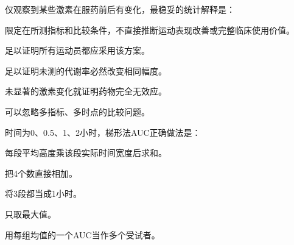 \par\addvspace{6pt}\noindent\begin{minipage}{\linewidth}


仅观察到某些激素在服药前后有变化，最稳妥的统计解释是：


\begin{choices}

\item 限定在所测指标和比较条件，不直接推断运动表现改善或完整临床使用价值。

\item 足以证明所有运动员都应采用该方案。

\item 足以证明未测的代谢率必然改变相同幅度。

\item 未显著的激素变化就证明药物完全无效应。

\item 可以忽略多指标、多时点的比较问题。

\end{choices}

\end{minipage}\par\vspace{4pt}

\par\addvspace{6pt}\noindent\begin{minipage}{\linewidth}


时间为0、0.5、1、2小时，梯形法AUC正确做法是：


\begin{choices}

\item 每段平均高度乘该段实际时间宽度后求和。

\item 把4个数直接相加。

\item 将3段都当成1小时。

\item 只取最大值。

\item 用每组均值的一个AUC当作多个受试者。

\end{choices}

\end{minipage}\par\vspace{4pt}

